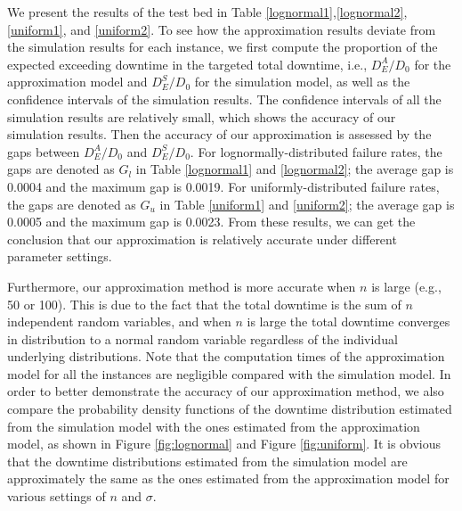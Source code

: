 \documentclass[preprint,12pt]{elsarticle}
\begin{document}
We present the results of the test bed in Table \ref{lognormal1},\ref{lognormal2}, \ref{uniform1}, and \ref{uniform2}. To see how the approximation results deviate from the simulation results for each instance, we first compute the proportion of the expected exceeding downtime in the targeted total downtime, i.e., $D_{E}^{A}/D_0$ for the approximation model and $D_{E}^{S}/D_0$ for the simulation model, as well as the confidence intervals of the simulation results. The confidence intervals of all the simulation results are relatively small, which shows the accuracy of our simulation results. Then the accuracy of our approximation is assessed by the gaps between $D_{E}^{A}/D_0$ and $D_{E}^{S}/D_0$. For lognormally-distributed failure rates, the gaps are denoted as $G_l$ in Table \ref{lognormal1} and \ref{lognormal2}; the average gap is 0.0004 and the maximum gap is 0.0019. For uniformly-distributed failure rates, the gaps are denoted as $G_u$ in Table \ref{uniform1} and \ref{uniform2}; the average gap is  0.0005 and the maximum gap is 0.0023. From these results, we can get the conclusion that our approximation is relatively accurate under different parameter settings.    


Furthermore, our approximation method is more accurate when $n$ is large (e.g., 50 or 100). This is due to the fact that the total downtime is the sum of $n$ independent random variables, and when $n$ is large the total downtime converges in distribution to a normal random variable regardless of the individual underlying distributions. Note that the computation times of the approximation model for all the instances are negligible compared with the simulation model. In order to better demonstrate the accuracy of our approximation method, we also compare the probability density functions of the downtime distribution estimated from the simulation model with the ones estimated from the approximation model, as shown in Figure \ref{fig:lognormal} and Figure \ref{fig:uniform}. It is obvious that the downtime distributions estimated from the simulation model are approximately the same as the ones estimated from the approximation model for various settings of $n$ and $\sigma$. 
\end{document}
